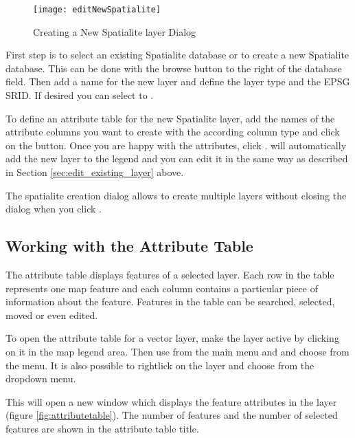 \begin{figure}[ht]
   \centering
   \texttt{[image: editNewSpatialite]}
   \caption{Creating a New Spatialite layer Dialog \nixcaption}\label{fig:newspatialitelayer}
\end{figure}

First step is to select an existing Spatialite database or to create a new
Spatialite database. This can be done with the browse  button
to the right of the database field. Then add a name for the new layer and
define the layer type and the EPSG SRID. If desired you can select to
.

To define an attribute table for the new Spatialite layer, add the names
of the attribute columns you want to create with the according column type
and click on the  button. Once you are happy
with the attributes, click . \qg will automatically add the new
layer to the legend and you can edit it in the same way as described in
Section \ref{sec:edit_existing_layer} above.

The spatialite creation dialog allows to create multiple layers without
closing the dialog when you click .

\subsection{Working with the Attribute Table}
\label{sec:attribute table}

The attribute table displays features of a selected layer. Each row in the table
represents one map feature and each column contains a particular piece of
information about the feature. Features in the table can be searched, selected,
moved or even edited.

To open the attribute table for a vector layer, make the layer active by clicking
on it in the map legend area. Then use  from the main menu
and and choose 
from the menu. It is also possible to rightlick on the layer and
choose  from the
dropdown menu.

This will open a new window which displays the feature attributes in the 
layer (figure \ref{fig:attributetable}). The number of features and the number 
of selected features are shown in the attribute table title.

